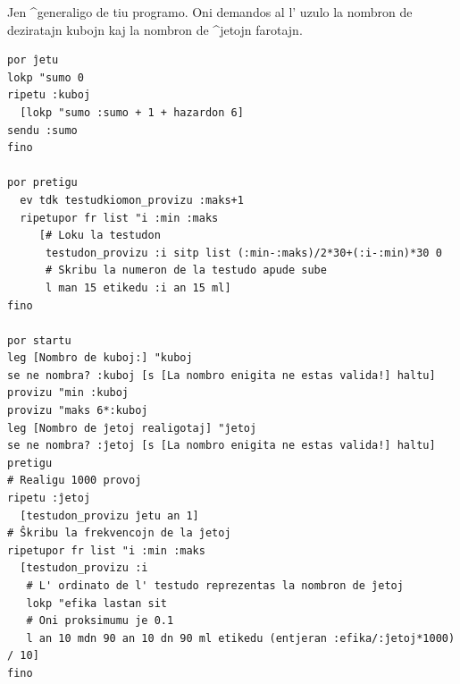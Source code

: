 Jen ^generaligo de tiu programo.  Oni demandos al l' uzulo la nombron
de deziratajn kubojn kaj la nombron de ^jetojn farotajn.
\begin{verbatim}
por ĵetu
lokp "sumo 0
ripetu :kuboj 
  [lokp "sumo :sumo + 1 + hazardon 6]
sendu :sumo
fino

por pretigu
  ev tdk testudkiomon_provizu :maks+1
  ripetupor fr list "i :min :maks 
     [# Loku la testudon
      testudon_provizu :i sitp list (:min-:maks)/2*30+(:i-:min)*30 0
      # Skribu la numeron de la testudo apude sube
      l man 15 etikedu :i an 15 ml]
fino

por startu
leg [Nombro de kuboj:] "kuboj
se ne nombra? :kuboj [s [La nombro enigita ne estas valida!] haltu]
provizu "min :kuboj
provizu "maks 6*:kuboj
leg [Nombro de ĵetoj realigotaj] "ĵetoj
se ne nombra? :ĵetoj [s [La nombro enigita ne estas valida!] haltu]
pretigu
# Realigu 1000 provoj
ripetu :ĵetoj 
  [testudon_provizu ĵetu an 1]
# Ŝkribu la frekvencojn de la ĵetoj
ripetupor fr list "i :min :maks 
  [testudon_provizu :i
   # L' ordinato de l' testudo reprezentas la nombron de ĵetoj
   lokp "efika lastan sit 
   # Oni proksimumu je 0.1
   l an 10 mdn 90 an 10 dn 90 ml etikedu (entjeran :efika/:ĵetoj*1000) / 10]
fino

\end{verbatim}

